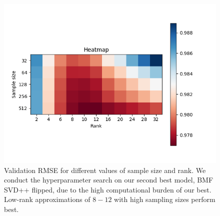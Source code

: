 \documentclass[10pt,conference,compsocconf]{IEEEtran}
\begin{document}
    \begin{figure}
        \includegraphics[width=\columnwidth]{figures/heatmap.png}
        \caption{Validation RMSE for different values of sample size and rank.
        We conduct the hyperparameter search on our second best model, BMF SVD++ flipped, due to the high computational burden of our best.
        Low-rank approximations of $8 - 12$ with high sampling sizes perform best.}
        \label{fig:heatmap}
    \end{figure}
\end{document}
